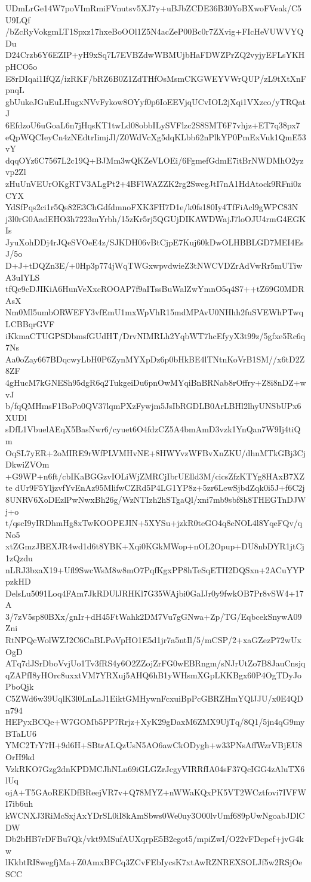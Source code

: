 UDmLrGe14W7poVImRmiFVnutsv5XJ7y+uBJbZCDE36B30YoBXwoFVeak/C5U9LQf
/bZcRyVokgmLT1Spxz17hxeBoOOl1Z5N4acZeP00Bc0r7ZXvig+FIcHeVUWVYQDu
D24Crzb6Y6EZIP+yH9xSq7L7EVBZdwWBMUjbHaFDWZPrZQ2vyjyEFLsYKHpHCO5o
E8rDIqai1IfQZ/izRKF/bRZ6B0Z1ZdTHfOsMsmCKGWEYVWrQUP/zL9tXtXnFpnqL
gbUukeJGuEuLHugxNVvFykow8OYyf0p6IoEEVjqUCvIOL2jXqi1VXzco/yTRQatJ
6EfdzoU6uGoaL6n7jHqsKT1twLd08obbILySVFlzc2S8SMT6F7vhjz+ET7q38px7
eQpWQCIeyCn4zNEdtrIimjJl/Z0WdVcXg5dqKLbb62nPlkYP0PmExVuk1QmE53vY
dqqOYz6C7567L2c19Q+BJMm3wQKZeVLOEi/6FgmefGdmE7itBrNWDMhO2yzvp2Zl
zHuUnVEUrOKgRTV3ALgPt2+4BFlWAZZK2rg2SwegJtI7nA1HdAtock9RFni0zCYX
YdSfPqs2ci1r5Qs82E3ChGdfdmnoFXK3FH7D1e/k0fs180Iy4TfFiAcl9gWPC83N
j3l0rG0AadEHO3h7223mYrbh/15zKr5rj5QGUjDIKAWDWajJ7loOJU4rmG4EGKIs
JyuXohDDj4rJQeSVOeE4z/SJKDH06vBtCjpE7Kuj60kDwOLHBBLGD7MEI4EsJ/5o
D+J+tDQZn3E/+0Hp3p774jWqTWGxwpvdwieZ3tNWCVDZrAdVwRr5mUTiwA3uIYLS
tfQe9cDJIKiA6HunVeXxcROOAP7f9aITssBuWalZwYmnO5q4S7++tZ69G0MDRAsX
Nm0Ml5umbORWEFY3vfEmU1mxWpVhR15mdMPAvU0NHhh2fuSVEWhPTwqLCBBqrGVF
iKkmaCTUGPSDbmsfGUdHT/DrvNIMRLh2YqbWT7hcEfyyX3t99z/5gfxe5Rc6q7Ns
Aa0oZay667BDqcwyLbH0P6ZynMYXpDz6p0bHkBE4lTNtnKoVrB1SM//x6tD2Z8ZF
4gHucM7kGNESh95dgR6q2TukgeiDu6pnOwMYqiBnBRNab8rOffry+Z8i8nDZ+wvJ
b/fqQMHmsF1BoPo0QV37lqmPXzFywjm5JsIbRGDLB0ArLBHl2lhyUNSbUPx6XUDl
sDfL1VbuelAEqX5BasNwr6/cyuet6O4fdzCZ5A4bmAmD3vzk1YnQan7W9Ij4tiQm
OqSL7yER+2oMIRE9rWfPLVMHvNE+8HWYvzWFBvXnZKU/dhnMTkGBj3CjDkwiZVOm
+G9WP+n6ft/cbIKaBGGzvIOLiWjZMRCjIbrUElld3M/cicsZfzKTYg8HAxB7XZte
dUr9F5YljzvfYvEnAz95MlifwCZRd5P4LG1YP8z+5zr6LewSjbdZqk0i5J+f6C2j
8UNRV6XoDEzlPwNwxBh26g/WzNTIzh2hSTgaQl/xni7mb9sbf8h8THEGTnDJWj+o
t/qscI9yIRDhmHg8xTwKOOPEJIN+5XYSu+jzkR0teGO4q8eNOL4l8YqeFQv/qNo5
xtZGmzJBEXJR4wd1d6t8YBK+Xqi0KGkMWop+nOL2Opup+DU8nbDYR1jtCj1zQzdu
nLRJ3bxaX19+Ufl9SwcWsM8w8mO7PqfKgxPP8hTeSqETH2DQSxn+2ACuYYPpzkHD
DelsLu5091Loq4FAm7JkRDUlJRHKl7G35WAjbi0GaIJr0y9fwkOB7Pr8vSW4+17A
3/7zV5sp80BXx/gnIr+dH45FtWahk2DM7Vu7gGNwa+Zp/TG/EqbcekSnywA09Zni
RtNPQcWolWZJ2C6CnBLPoVpHO1E5d1jr7a5ntIl/5/mCSP/2+xaGZezP72wUxOgD
ATq7dJSrDboVvjUo1Tv3fRS4y6O2ZZojZrFG0wEBRngm/sNJrUtZo7B8JauCnsjq
qZAPfI8yHOrc8uxxtVM7YRXuj5AHQ6hB1yWHsmXGpLKKBgx60P4OgTDyJoPboQjk
C5ZWd6w39UqlK3l0LnLaJ1EiktGMHywnFcxuiBpPcGBRZHmYQlJJU/x0E4QDn794
HEPyxBCQe+W7GOMb5PP7Rrjz+XyK29gDaxM6ZMX9UjTq/8Q1/5jn4qG9myBTaLU6
YMC2TrY7H+9d6H+SBtrALQzUsN5AO6awCkODygh+w33PNsAffWzrVBjEU8OrH9kd
VzkRKO7Gzg2dnKPDMCJhNLn69iGLGZrJcgyVIRRfIA04sF37QcIGG4zAluTX6lUq
ojA+T5GAoREKDfBReejVR7v+Q78MYZ+nWWaKQxPK5VT2WCztfovi7IVFWI7ib6uh
kWCNXJ3RiMcSxjAxYDrSL0iI8kAmSbws0We0uy3O00lvUmf689pUwNgoabJDlCDW
Db2bHB7rDFBu7Qk/vkt9MSufAUXqrpE5B2egot5/mpiZwI/O22vFDcpcf+jvG4kw
lKkbtRI8wegfjMa+Z0AmxBFCq3ZCvFEbIycsK7xtAwRZNREXSOLJf5w2RSjOeSCC
